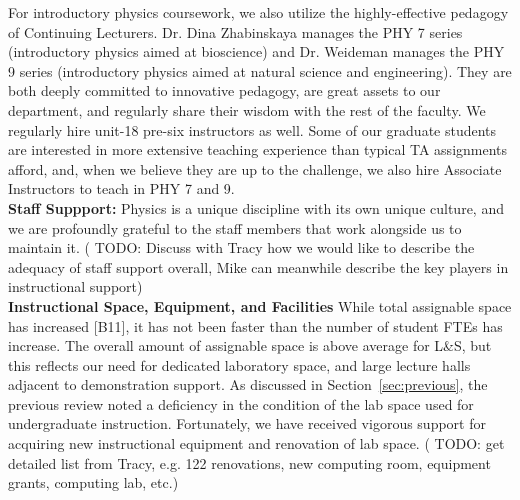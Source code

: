 \documentclass[12pt]{article}
\begin{document}
For introductory physics coursework, we also utilize the
highly-effective pedagogy of Continuing Lecturers.  Dr. Dina
Zhabinskaya manages the PHY 7 series (introductory physics aimed at
bioscience) and Dr. Weideman manages the PHY 9 series (introductory
physics aimed at natural science and engineering).  They are both
deeply committed to innovative pedagogy, are great assets to our
department, and regularly share their wisdom with the rest of the
faculty.  We regularly hire unit-18 pre-six instructors as well.  Some
of our graduate students are interested in more extensive teaching
experience than typical TA assignments afford, and, when we believe
they are up to the challenge, we also hire Associate Instructors to
teach in PHY 7 and 9.\\[3pt]

\noindent
{\bf Staff Suppport:}
Physics is a unique discipline with its own unique culture, and we are profoundly grateful to the staff members that work alongside us to maintain it.
({\color{red} TODO:  Discuss with Tracy how we would like to describe the adequacy of staff support overall, Mike can meanwhile describe the key players in instructional support})\\[3pt]


\noindent
{\bf Instructional Space, Equipment, and Facilities} While total
assignable space has increased [B11], it has not been faster than the
number of student FTEs has increase.  The overall amount of assignable
space is above average for L\&S, but this reflects our need for
dedicated laboratory space, and large lecture halls adjacent to
demonstration support.  As discussed in Section~\ref{sec:previous},
the previous review noted a deficiency in the condition of the lab
space used for undergraduate instruction.  Fortunately, we have
received vigorous support for acquiring new instructional equipment
and renovation of lab space.  ({\color{red} TODO: get detailed list
  from Tracy, e.g. 122 renovations, new computing room, equipment
  grants, computing lab, etc}.)\\[3pt]
\end{document}
